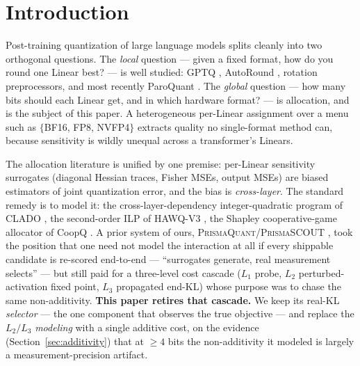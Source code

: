 \documentclass[11pt]{article}
\theoremstyle{plain}
\theoremstyle{definition}
\begin{document}
\begin{abstract}
format \emph{menu} (an intermediate-efficiency rung such as FP8), not of the
sensitivity distribution --- which is why a two-rung NVFP4/BF16 frontier looks
linear on a log-KL axis even though a better cost still wins by shifting it
\emph{down}. We position \textsc{Aura} as a production-faithful realization of
the well-studied Fisher/KL sensitivity family, not as new sensitivity theory,
and we report the limitations (weight-only scoring under W4A4 activation
quantization; bf16-stored rendering error) that a faithful account requires.
In doing so we retire the multi-level cost cascade of our prior
\textsc{PrismaSCOUT} system in favour of a single additive cost plus served-KL
selection.
\end{abstract}

\section{Introduction}\label{sec:intro}

Post-training quantization of large language models splits cleanly into two
orthogonal questions. The \emph{local} question --- given a fixed format, how do
you round one Linear best? --- is well studied: GPTQ \cite{gptq2022},
AutoRound \cite{autoround2023}, rotation preprocessors, and most recently
ParoQuant \cite{paroquant}. The \emph{global} question --- how many bits should
each Linear get, and in which hardware format? --- is allocation, and is the
subject of this paper. A heterogeneous per-Linear assignment over a menu such as
$\{$BF16, FP8, NVFP4$\}$ extracts quality no single-format method can, because
sensitivity is wildly unequal across a transformer's Linears.

The allocation literature is unified by one premise: per-Linear sensitivity
surrogates (diagonal Hessian traces, Fisher MSEs, output MSEs) are biased
estimators of joint quantization error, and the bias is \emph{cross-layer}. The
standard remedy is to model it: the cross-layer-dependency integer-quadratic
program of CLADO \cite{clado2023}, the second-order ILP of HAWQ-V3
\cite{hawqv3}, the Shapley cooperative-game allocator of CoopQ \cite{coopq}.
A prior system of ours, \textsc{PrismaQuant}/\textsc{PrismaSCOUT}
\cite{prismaquant}, took the position that one need not model the interaction at
all if every shippable candidate is re-scored end-to-end --- ``surrogates
generate, real measurement selects'' --- but still paid for a three-level cost
cascade ($L_1$ probe, $L_2$ perturbed-activation fixed point, $L_3$ propagated
end-KL) whose purpose was to chase the same non-additivity. \textbf{This paper
retires that cascade.} We keep its real-KL \emph{selector} --- the one component
that observes the true objective --- and replace the $L_2/L_3$ \emph{modeling}
with a single additive cost, on the evidence (Section~\ref{sec:additivity}) that
at $\ge 4$ bits the non-additivity it modeled is largely a measurement-precision
artifact.
\end{document}
